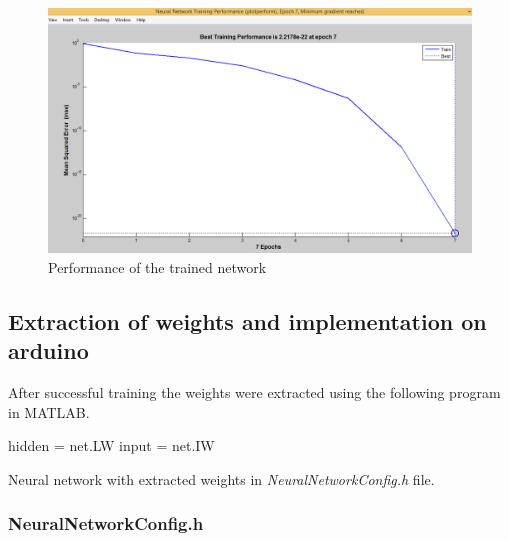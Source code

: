\documentclass[14pt,a4paper]{extarticle}
\begin{document}
 	\begin{figure}[H]
		\includegraphics[width=\textwidth]{traininggraphmatlab.png}
		\caption{Performance of the trained network}
		\label{fig:performance}
	\end{figure}		
	
	\subsection{Extraction of weights and implementation on arduino}
	
	After successful training the weights were extracted using the following program in MATLAB.
	
	\begin{spverbatim}
hidden = net.LW
input = net.IW

	\end{spverbatim}
	
	Neural network with extracted weights in \textit{NeuralNetworkConfig.h} file. 
	
	\subsubsection{NeuralNetworkConfig.h}
	
\end{document}

